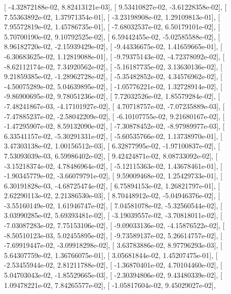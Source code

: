 \documentclass{article}
\begin{document}
       [ -4.32872188e-02,   8.82413121e-03],
       [  9.53410827e-02,  -3.61228358e-02],
       [  7.55363892e-02,   1.37971354e-01],
       [ -3.23198908e-02,   1.29109813e-01],
       [  7.95572819e-02,   1.45786735e-01],
       [ -7.68032537e-02,   6.50179101e-02],
       [  5.70700190e-02,   9.10792525e-02],
       [  6.59442455e-02,  -5.02585588e-02],
       [  8.96182720e-02,  -2.15939429e-02],
       [ -9.44336675e-02,   1.41659665e-01],
       [ -6.30683625e-02,   1.12819088e-01],
       [ -9.79375143e-02,  -4.72378092e-02],
       [ -8.62112174e-02,   7.34920562e-02],
       [ -5.16187735e-02,   3.13630136e-02],
       [  9.21859385e-02,  -1.28962728e-02],
       [ -5.35482852e-02,   4.34576962e-02],
       [ -4.50075289e-02,   5.04639895e-02],
       [ -1.05776221e-02,   1.32728914e-02],
       [ -9.86900695e-02,   9.78051236e-02],
       [  7.72032526e-02,   1.85579284e-02],
       [ -7.48241867e-03,  -4.17101927e-02],
       [  4.70718757e-02,  -7.07235889e-03],
       [ -7.47885237e-02,  -2.58042209e-02],
       [ -6.10107755e-02,   9.21680167e-02],
       [ -1.47295907e-02,   8.59132090e-02],
       [ -7.30878452e-02,  -8.97989977e-03],
       [  6.33541157e-02,  -5.30291331e-02],
       [ -5.60535766e-02,   1.13738970e-01],
       [  3.47303138e-02,   1.00156512e-03],
       [  6.32877995e-02,  -1.97100837e-02],
       [  7.53093039e-03,   6.59986402e-02],
       [  9.42424871e-02,   8.08733092e-02],
       [ -3.15218374e-02,   4.78486964e-02],
       [ -5.12115363e-02,   1.43678461e-01],
       [ -1.90345779e-02,  -3.66079791e-02],
       [  9.59009468e-02,   1.25429733e-01],
       [  6.30191828e-03,  -4.68725474e-02],
       [  6.75894153e-02,   1.26821797e-01],
       [  2.62290113e-02,   2.21386530e-03],
       [  8.70448912e-02,  -5.04946376e-02],
       [ -3.55160149e-02,   1.61946747e-02],
       [  7.04581078e-02,  -5.32560544e-02],
       [  3.03990285e-02,   5.69393481e-02],
       [ -3.19039557e-02,  -3.70818011e-02],
       [ -7.03087283e-02,   7.75153106e-02],
       [ -9.09033136e-02,  -4.15876522e-02],
       [ -8.50510123e-03,   5.02455895e-02],
       [ -9.73589137e-02,   5.26614757e-02],
       [ -7.69919447e-02,  -3.09918298e-02],
       [  3.63783886e-02,   8.97796293e-03],
       [  5.64307759e-02,   1.36766075e-01],
       [  3.05681844e-02,   1.45207475e-01],
       [ -2.53455944e-02,   2.81211788e-02],
       [ -1.36870401e-02,   4.70104460e-02],
       [  5.04703043e-02,  -1.85529665e-03],
       [ -2.30394806e-02,   9.43480339e-02],
       [  1.09478221e-02,   7.84265577e-02],
       [ -1.05817604e-02,   9.45029027e-02],
\end{document}
